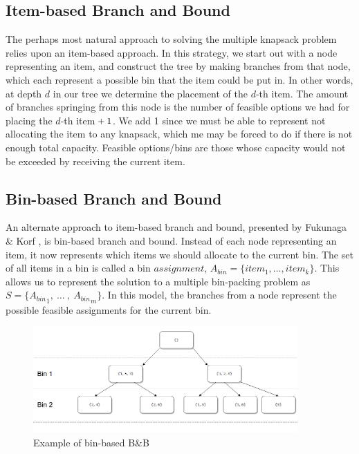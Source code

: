 \documentclass[b5paper]{article}
\begin{document}
\subsection{Item-based Branch and Bound}
The perhaps most natural approach to solving the multiple knapsack problem
relies upon an item-based approach. In this strategy, we start out with a node representing an item,
and construct the tree by making branches from that node, which each represent a possible bin that the item could
be put in. In other words, at depth $d$ in our tree we determine the placement of the $d$-th item.
The amount of branches springing from this node is the number of feasible options we had for placing the $d$-th item$\null+1$.
We add 1 since we must be able to represent not allocating the item to any knapsack, which me may be forced to do if there is not enough total capacity.
Feasible options/bins are those whose capacity would not be exceeded by receiving the current item.


\subsection{Bin-based Branch and Bound}
An alternate approach to item-based branch and bound, presented by Fukunaga \& Korf \cite{fukunaga_bin_2007}, is bin-based branch and bound.
Instead of each node representing an item, it now represents which items we should allocate to the current bin.
The set of all items in a bin is called a bin $assignment$, $A_{bin} = \{\textit{item}_1, \ldots, item_k\}$.
This allows us to represent the solution to a multiple bin-packing problem as $S = \{{A_{\textit{bin}}}_1, \: \ldots \:,\: {A_{bin}}_m\}$.
In this model, the branches from a node represent the possible feasible assignments for the current bin. 

\begin{figure}[h]
\centering
\includegraphics[width=0.9\textwidth]{bin_oriented.PNG}
\caption{Example of bin-based B\&B}
\end{figure}
\end{document}

